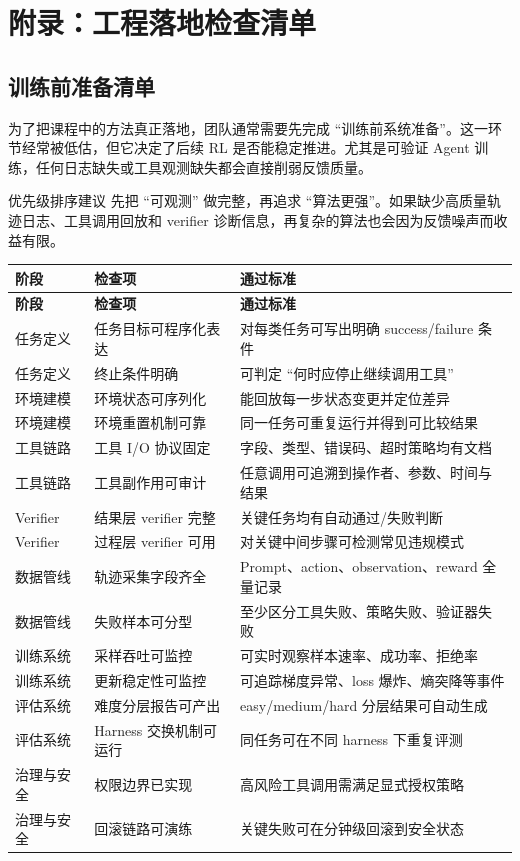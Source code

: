 \section{附录：工程落地检查清单}

\subsection{训练前准备清单}
为了把课程中的方法真正落地，团队通常需要先完成 ``训练前系统准备''。这一环节经常被低估，但它决定了后续 RL 是否能稳定推进。尤其是可验证 Agent 训练，任何日志缺失或工具观测缺失都会直接削弱反馈质量。

\begin{importantbox}{优先级排序建议}
先把 ``可观测'' 做完整，再追求 ``算法更强''。如果缺少高质量轨迹日志、工具调用回放和 verifier 诊断信息，再复杂的算法也会因为反馈噪声而收益有限。
\end{importantbox}

\begin{longtable}{p{2.6cm}p{3.4cm}p{5.0cm}}
\toprule
\textbf{阶段} & \textbf{检查项} & \textbf{通过标准} \\
\midrule
\endfirsthead
\toprule
\textbf{阶段} & \textbf{检查项} & \textbf{通过标准} \\
\midrule
\endhead
任务定义 & 任务目标可程序化表达 & 对每类任务可写出明确 success/failure 条件 \\
任务定义 & 终止条件明确 & 可判定 ``何时应停止继续调用工具'' \\
环境建模 & 环境状态可序列化 & 能回放每一步状态变更并定位差异 \\
环境建模 & 环境重置机制可靠 & 同一任务可重复运行并得到可比较结果 \\
工具链路 & 工具 I/O 协议固定 & 字段、类型、错误码、超时策略均有文档 \\
工具链路 & 工具副作用可审计 & 任意调用可追溯到操作者、参数、时间与结果 \\
Verifier & 结果层 verifier 完整 & 关键任务均有自动通过/失败判断 \\
Verifier & 过程层 verifier 可用 & 对关键中间步骤可检测常见违规模式 \\
数据管线 & 轨迹采集字段齐全 & Prompt、action、observation、reward 全量记录 \\
数据管线 & 失败样本可分型 & 至少区分工具失败、策略失败、验证器失败 \\
训练系统 & 采样吞吐可监控 & 可实时观察样本速率、成功率、拒绝率 \\
训练系统 & 更新稳定性可监控 & 可追踪梯度异常、loss 爆炸、熵突降等事件 \\
评估系统 & 难度分层报告可产出 & easy/medium/hard 分层结果可自动生成 \\
评估系统 & Harness 交换机制可运行 & 同任务可在不同 harness 下重复评测 \\
治理与安全 & 权限边界已实现 & 高风险工具调用需满足显式授权策略 \\
治理与安全 & 回滚链路可演练 & 关键失败可在分钟级回滚到安全状态 \\
\bottomrule
\end{longtable}

